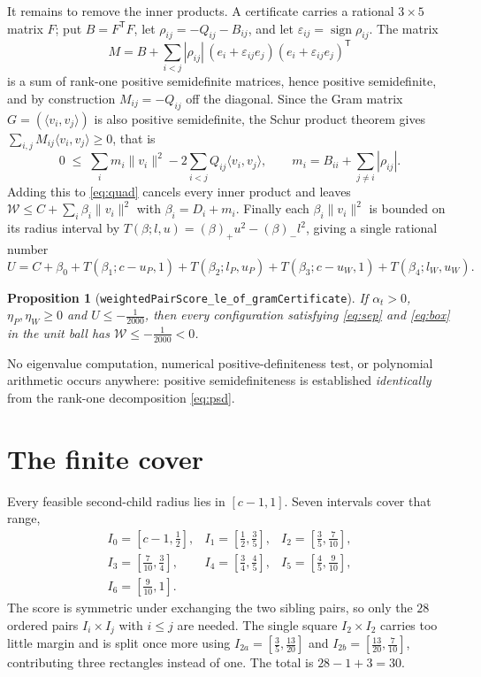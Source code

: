 \documentclass[11pt]{article}
\newtheorem{proposition}[theorem]{Proposition}
\newcommand{\score}{\mathcal{W}}
\newcommand{\ip}[2]{\langle #1,#2\rangle}
\newcommand{\norm}[1]{\lVert #1\rVert}
\begin{document}
It remains to remove the inner products. A certificate carries a rational $3\times5$ matrix $F$;
put $B=F^{\mathsf T}F$, let $\rho_{ij}=-Q_{ij}-B_{ij}$, and let
$\varepsilon_{ij}=\operatorname{sign}\rho_{ij}$. The matrix
\begin{equation}
M=B+\sum_{i<j}|\rho_{ij}|\,(e_i+\varepsilon_{ij}e_j)(e_i+\varepsilon_{ij}e_j)^{\mathsf T}
\label{eq:psd}
\end{equation}
is a sum of rank-one positive semidefinite matrices, hence positive semidefinite, and by
construction $M_{ij}=-Q_{ij}$ off the diagonal. Since the Gram matrix
$G=(\ip{v_i}{v_j})$ is also positive semidefinite, the Schur product theorem gives
$\sum_{i,j}M_{ij}\ip{v_i}{v_j}\ge0$, that is
\[
0\;\le\;\sum_i m_i\norm{v_i}^2-2\sum_{i<j}Q_{ij}\ip{v_i}{v_j},
\qquad m_i=B_{ii}+\sum_{j\ne i}|\rho_{ij}| .
\]
Adding this to \eqref{eq:quad} cancels every inner product and leaves
$\score\le C+\sum_i\beta_i\norm{v_i}^2$ with $\beta_i=D_i+m_i$. Finally each
$\beta_i\norm{v_i}^2$ is bounded on its radius interval by
$T(\beta;l,u)=(\beta)_+u^2-(\beta)_-l^2$, giving a single rational number
\begin{equation}
U=C+\beta_0+T(\beta_1;c-u_P,1)+T(\beta_2;l_P,u_P)+T(\beta_3;c-u_W,1)+T(\beta_4;l_W,u_W).
\label{eq:U}
\end{equation}

\begin{proposition}[\texttt{weightedPairScore\_le\_of\_gramCertificate}]
If $\alpha_t>0$, $\eta_P,\eta_W\ge0$ and $U\le-\frac1{2000}$, then every configuration satisfying
\eqref{eq:sep} and \eqref{eq:box} in the unit ball has $\score\le-\frac1{2000}<0$.
\end{proposition}

No eigenvalue computation, numerical positive-definiteness test, or polynomial arithmetic occurs
anywhere: positive semidefiniteness is established \emph{identically} from the rank-one
decomposition \eqref{eq:psd}.

\section{The finite cover}

Every feasible second-child radius lies in $[c-1,1]$. Seven intervals cover that range,
\[
\begin{array}{lll}
I_0=[c-1,\tfrac12], & I_1=[\tfrac12,\tfrac35], & I_2=[\tfrac35,\tfrac7{10}],\\[2pt]
I_3=[\tfrac7{10},\tfrac34], & I_4=[\tfrac34,\tfrac45], & I_5=[\tfrac45,\tfrac9{10}],\\[2pt]
I_6=[\tfrac9{10},1]. &&
\end{array}
\]
The score is symmetric under exchanging the two sibling pairs, so only the $28$ ordered pairs
$I_i\times I_j$ with $i\le j$ are needed. The single square $I_2\times I_2$ carries too little
margin and is split once more using $I_{2a}=[\tfrac35,\tfrac{13}{20}]$ and
$I_{2b}=[\tfrac{13}{20},\tfrac7{10}]$, contributing three rectangles instead of one. The total is
$28-1+3=30$.
\end{document}

